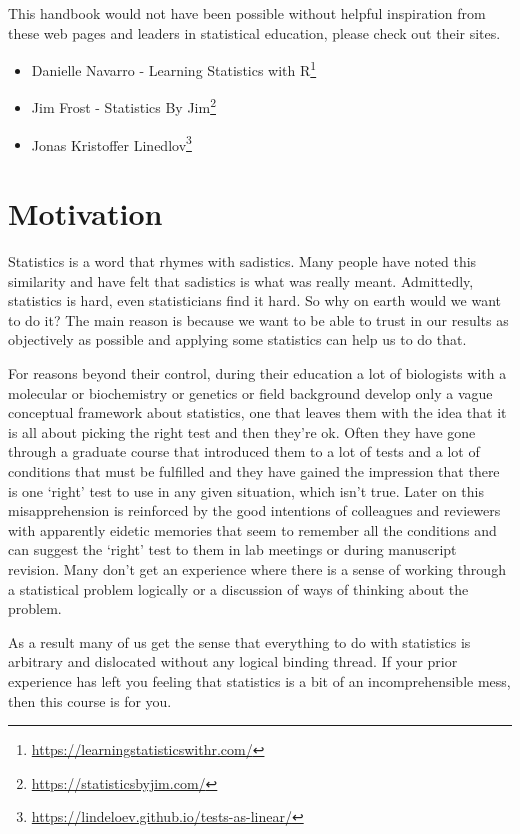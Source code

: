\documentclass[
]{book}
\providecommand{\tightlist}{%
  \setlength{\itemsep}{0pt}\setlength{\parskip}{0pt}}
\renewcommand{\href}[2]{#2\footnote{\url{#1}}}
\begin{document}
This handbook would not have been possible without helpful inspiration from these web pages and leaders in statistical education, please check out their sites.

\begin{itemize}
\tightlist
\item
  \href{https://learningstatisticswithr.com/}{Danielle Navarro - Learning Statistics with R}
\item
  \href{https://statisticsbyjim.com/}{Jim Frost - Statistics By Jim}
\item
  \href{https://lindeloev.github.io/tests-as-linear/}{Jonas Kristoffer Linedlov}
\end{itemize}

\hypertarget{motivation}{%
\chapter{Motivation}\label{motivation}}

Statistics is a word that rhymes with sadistics. Many people have noted this similarity and have felt that sadistics is what was really meant. Admittedly, statistics is hard, even statisticians find it hard. So why on earth would we want to do it? The main reason is because we want to be able to trust in our results as objectively as possible and applying some statistics can help us to do that.

For reasons beyond their control, during their education a lot of biologists with a molecular or biochemistry or genetics or field background develop only a vague conceptual framework about statistics, one that leaves them with the idea that it is all about picking the right test and then they're ok. Often they have gone through a graduate course that introduced them to a lot of tests and a lot of conditions that must be fulfilled and they have gained the impression that there is one `right' test to use in any given situation, which isn't true. Later on this misapprehension is reinforced by the good intentions of colleagues and reviewers with apparently eidetic memories that seem to remember all the conditions and can suggest the `right' test to them in lab meetings or during manuscript revision. Many don't get an experience where there is a sense of working through a statistical problem logically or a discussion of ways of thinking about the problem.

As a result many of us get the sense that everything to do with statistics is arbitrary and dislocated without any logical binding thread. If your prior experience has left you feeling that statistics is a bit of an incomprehensible mess, then this course is for you.
\end{document}
